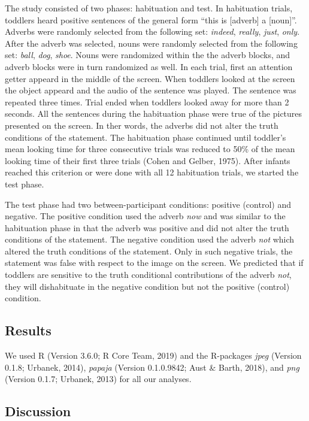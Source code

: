 \documentclass[man,floatsintext]{apa6}
\begin{document}
The study consisted of two phases: habituation and test. In habituation trials, toddlers heard positive sentences of the general form \enquote{this is {[}adverb{]} a {[}noun{]}}. Adverbs were randomly selected from the following set: \emph{indeed}, \emph{really}, \emph{just}, \emph{only}. After the adverb was selected, nouns were randomly selected from the following set: \emph{ball}, \emph{dog}, \emph{shoe}. Nouns were randomized within the the adverb blocks, and adverb blocks were in turn randomized as well. In each trial, first an attention getter appeard in the middle of the screen. When toddlers looked at the screen the object appeard and the audio of the sentence was played. The sentence was repeated three times. Trial ended when toddlers looked away for more than 2 seconds. All the sentences during the habituation phase were true of the pictures presented on the screen. In ther words, the adverbs did not alter the truth conditions of the statement. The habituation phase continued until toddler's mean looking time for three consecutive trials was reduced to 50\% of the mean looking time of their first three trials (Cohen and Gelber, 1975). After infants reached this criterion or were done with all 12 habituation trials, we started the test phase.

The test phase had two between-participant conditions: positive (control) and negative. The positive condition used the adverb \emph{now} and was similar to the habituation phase in that the adverb was positive and did not alter the truth conditions of the statement. The negative condition used the adverb \emph{not} which altered the truth conditions of the statement. Only in such negative trials, the statement was false with respect to the image on the screen. We predicted that if toddlers are sensitive to the truth conditional contributions of the adverb \emph{not}, they will dishabituate in the negative condition but not the positive (control) condition.

\hypertarget{results}{%
\subsection{Results}\label{results}}

We used R (Version 3.6.0; R Core Team, 2019) and the R-packages \emph{jpeg} (Version 0.1.8; Urbanek, 2014), \emph{papaja} (Version 0.1.0.9842; Aust \& Barth, 2018), and \emph{png} (Version 0.1.7; Urbanek, 2013) for all our analyses.

\hypertarget{discussion}{%
\subsection{Discussion}\label{discussion}}
\end{document}
